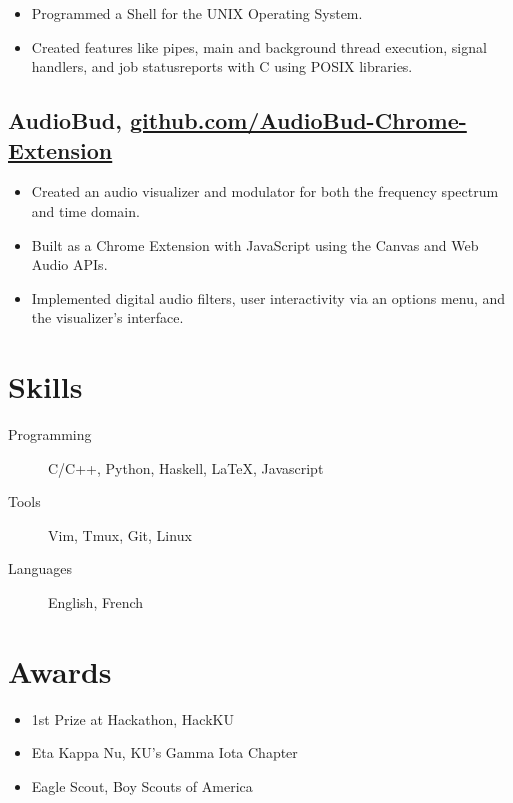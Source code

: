 \documentclass{mycv}
\begin{document}
\begin{itemize}
    \item Programmed a Shell for the UNIX Operating System.
    \item Created features like pipes, main and background thread execution, signal handlers, and job statusreports with C using POSIX libraries.
\end{itemize}
 
\subsection{AudioBud\normalfont, \href{http://github.com/eric-delacruz-prod/AudioBud-Chrome-Extension}{github.com/AudioBud-Chrome-Extension}}

\begin{itemize}
    \item Created an audio visualizer and modulator for both the frequency spectrum and time domain.
    \item Built as a Chrome Extension with JavaScript using the Canvas and Web Audio APIs.
    \item Implemented digital audio filters, user interactivity via an options menu, and the visualizer’s interface.
\end{itemize}

\section{Skills}

\begin{description}
  \item[Programming] C/C++, Python, Haskell, \LaTeX, Javascript
  \item[Tools] Vim, Tmux, Git, Linux
  \item[Languages] English, French
\end{description}

\section{Awards}

\begin{itemize}
  \item 1st Prize at Hackathon, HackKU 
  \item Eta Kappa Nu, KU's Gamma Iota Chapter 
  \item Eagle Scout, Boy Scouts of America 
\end{itemize}
\end{document}
